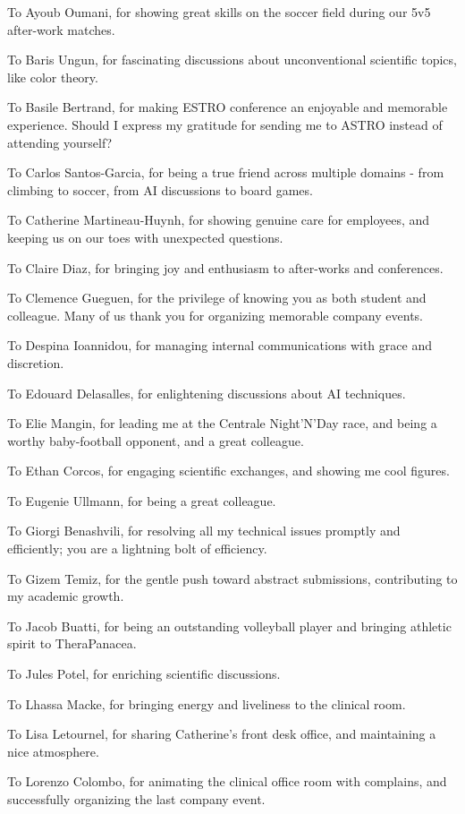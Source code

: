To Ayoub Oumani, for showing great skills on the soccer field during our 5v5 after-work matches.

To Baris Ungun, for fascinating discussions about unconventional scientific topics, like color theory.

To Basile Bertrand, for making ESTRO conference an enjoyable and memorable experience.
Should I express my gratitude for sending me to ASTRO instead of attending yourself?

To Carlos Santos-Garcia, for being a true friend across multiple domains - from climbing to soccer, from AI discussions to board games.

To Catherine Martineau-Huynh, for showing genuine care for employees, and keeping us on our toes with unexpected questions.

To Claire Diaz, for bringing joy and enthusiasm to after-works and conferences.

To Clemence Gueguen, for the privilege of knowing you as both student and colleague.
Many of us thank you for organizing memorable company events.

To Despina Ioannidou, for managing internal  communications with grace and discretion.

To Edouard Delasalles, for enlightening discussions about AI techniques.

To Elie Mangin, for leading me at the Centrale Night'N'Day race, and being a worthy baby-football opponent, and a great colleague.

To Ethan Corcos, for engaging scientific exchanges, and showing me cool figures.

To Eugenie Ullmann, for being a great colleague.

To Giorgi Benashvili, for resolving all my technical issues promptly and efficiently; you are a lightning bolt of efficiency.

To Gizem Temiz, for the gentle push toward abstract submissions, contributing to my academic growth.

To Jacob Buatti, for being an outstanding volleyball player and bringing athletic spirit to TheraPanacea.

To Jules Potel, for enriching scientific discussions.

To Lhassa Macke, for bringing energy and liveliness to the clinical room.

To Lisa Letournel, for sharing Catherine's front desk office, and maintaining a nice atmosphere.

To Lorenzo Colombo, for animating the clinical office room with complains, and successfully organizing the last company event.

